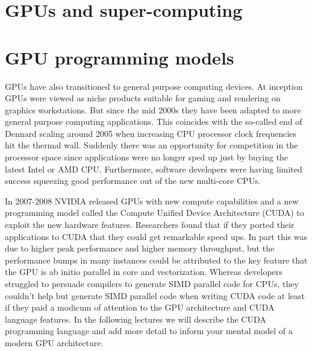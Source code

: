 \section{GPUs and super-computing}


\section{GPU programming models}



 GPUs have also transitioned to general purpose computing devices. At inception GPUs were viewed as niche products suitable for gaming and rendering on graphics workstations. But since the mid 2000s they have been adapted to more general purpose computing applications. This coincides with the so-called end of Dennard scaling around 2005 when increasing CPU processor clock frequencies hit the thermal wall. Suddenly there was an opportunity for competition in the processor space since applications were no longer sped up just by buying the latest Intel or AMD CPU. Furthermore, software developers were having limited success squeezing good performance out of the new multi-core CPUs. 

In 2007-2008 NVIDIA released  GPUs with new compute capabilities and a new programming model called the Compute Unified Device Architecture (CUDA) to exploit the new hardware features. Researchers found that if they ported their applications to CUDA that they could get remarkable speed ups. In part this was due to higher peak performance and higher memory throughput, but the performance bumps  in many instances could be attributed to the key feature that the GPU is ab initio parallel in core and vectorization. Whereas developers struggled to persuade compilers to generate SIMD parallel code for CPUs, they couldn't help but generate SIMD parallel code when writing CUDA code at least if they paid a modicum of attention to the GPU architecture and CUDA language features. In the following lectures we will describe the CUDA programming language and add more detail to inform your mental model of a modern GPU architecture.


